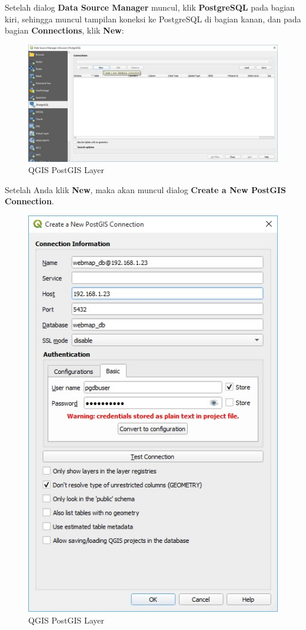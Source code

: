 \documentclass[]{book}
\begin{document}
\begin{itemize}
  Setelah dialog \textbf{Data Source Manager} muncul, klik \textbf{PostgreSQL} pada bagian kiri, sehingga muncul tampilan koneksi ke PostgreSQL di bagian kanan, dan pada bagian \textbf{Connections}, klik \textbf{New}:

  \begin{figure}
  \centering
  \includegraphics{./img/qgis-dsm-dialog.jpg}
  \caption{QGIS PostGIS Layer}
  \end{figure}

  Setelah Anda klik \textbf{New}, maka akan muncul dialog \textbf{Create a New PostGIS Connection}.

  \begin{figure}
  \centering
  \includegraphics{./img/qgis-create-connection.jpg}
  \caption{QGIS PostGIS Layer}
  \end{figure}


\end{itemize}
\end{document}
